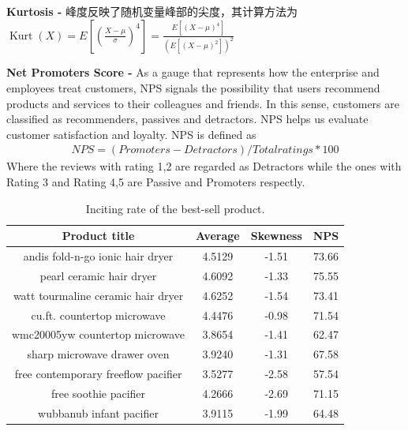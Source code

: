\documentclass[12pt]{article}%
\begin{document}
\textbf{Kurtosis -} 峰度反映了随机变量峰部的尖度，其计算方法为$\operatorname{Kurt}(X)=E\left[\left(\frac{X-\mu}{\sigma}\right)^{4}\right]=\frac{E\left[(X-\mu)^{4}\right]}{\left(E\left[(X-\mu)^{2}\right]\right)^{2}}
$

\textbf{Net Promoters Score -} 
As a gauge that represents how the enterprise and employees treat customers, NPS signals the possibility that users recommend products and services to their colleagues and friends. In this sense, customers are classified as recommenders, passives and detractors. NPS helps us evaluate customer satisfaction and loyalty\cite{nsp}. NPS is defined as
\begin{gather}
NPS = (Promoters - Detractors)/Total ratings * 100
\end{gather}
Where the reviews with rating 1,2 are regarded as Detractors while the ones with Rating 3 and Rating 4,5 are Passive and Promoters respectly.

\begin{table}[H]
	\centering
	\caption{Inciting rate of the best-sell product.}	
	\begin{tabular}{cccc}
		\toprule[1.5pt]
		\multicolumn{1}{m{7cm}}{\centering Product title} & \multicolumn{1}{m{2cm}}{\centering Average}&
		\multicolumn{1}{m{2cm}}{\centering Skewness} &
		\multicolumn{1}{m{2cm}}{\centering NPS} \\
		\midrule[1pt]
	andis fold-n-go ionic hair dryer &4.5129&-1.51&73.66\\
		pearl ceramic hair dryer     & 4.6092&-1.33&75.55\\
		watt tourmaline ceramic hair dryer          &4.6252&-1.54&73.41\\
		\midrule[1pt]
		cu.ft. countertop microwave          &4.4476&-0.98&71.54\\
		wmc20005yw  countertop microwave          &3.8654&-1.41&62.47\\
		sharp microwave drawer oven        &3.9240&-1.31&67.58\\
		\midrule[1pt]
		free contemporary freeflow pacifier        &3.5277&-2.58&57.54\\
		free soothie pacifier       &4.2666&-2.69&71.15\\
		wubbanub infant pacifier&3.9115&-1.99&64.48\\
		\bottomrule[1.6pt]
	\end{tabular}\label{biasssssssso}
\end{table}
\end{document}

